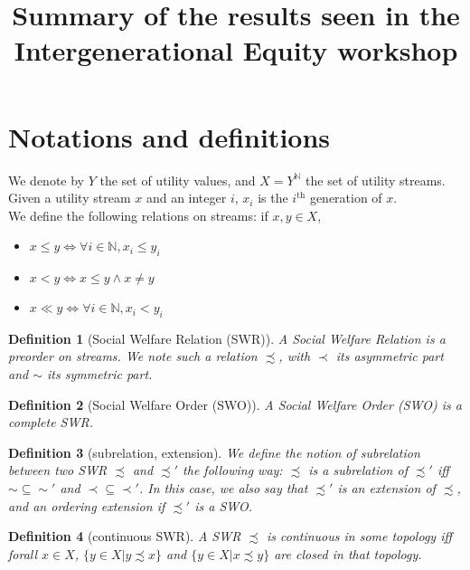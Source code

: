 \documentclass{article}
\title{Summary of the results seen in the Intergenerational Equity workshop}
\author{}
\date{}
\newtheorem{definition}{Definition}
\begin{document}
\maketitle

\section{Notations and definitions}

We denote by $Y$ the set of utility values, and $X=Y^{\mathbb{N}}$ the set of
utility streams.\smallskip\\
Given a utility stream $x$ and an integer $i$, $x_i$ is the $i^\text{th}$
generation of $x$.\smallskip\\
We define the following relations on streams: if $x,y\in X$,
\begin{itemize}
    \item $x \leq y \Leftrightarrow \forall i \in \mathbb{N},
        x_i\leq y_i$
    \item $x < y \Leftrightarrow x \leq y \land x \neq y$
    \item $x \ll y \Leftrightarrow \forall i \in \mathbb{N},
        x_i < y_i$
\end{itemize}\par

\begin{definition}[Social Welfare Relation (SWR)]
  A Social Welfare Relation is a preorder on streams. We note such a relation
$\precsim$, with $\prec$ its asymmetric part and $\sim$ its symmetric part.
\end{definition}

\begin{definition}[Social Welfare Order (SWO)]
  A Social Welfare Order (SWO) is a complete SWR.
\end{definition}

\begin{definition}[subrelation, extension]
  We define the notion of subrelation between two SWR $\precsim$ and $\precsim'$
the following way: $\precsim$ is a subrelation of $\precsim'$ iff 
$\sim\subseteq\sim'$ and $\prec\subseteq\prec'$. In this case, we also say that
$\precsim'$ is an extension of $\precsim$, and an ordering extension if
$\precsim'$ is a SWO.
\end{definition}

\begin{definition}[continuous SWR]
  A SWR $\precsim$ is continuous in some topology iff forall $x\in X$,
$\{y\in X|y\precsim x\}$ and $\{y\in X|x\precsim y\}$ are closed in that
topology.
\end{definition}
\end{document}
